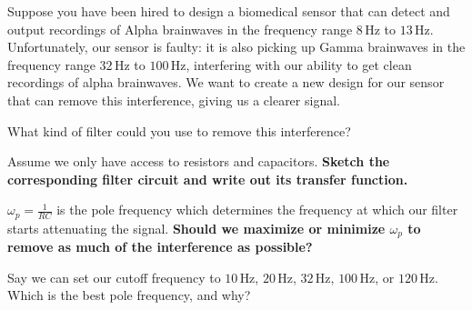 
Suppose you have been hired to design a biomedical sensor that can detect and output recordings of Alpha brainwaves in the frequency range $8 \, \text{Hz}$ to $13 \, \text{Hz}$. 
Unfortunately, our sensor is faulty: it is also picking up Gamma brainwaves in the frequency range $32 \, \text{Hz}$ to $100 \, \text{Hz}$, interfering with our ability to get clean recordings of alpha brainwaves. 
We want to create a new design for our sensor that can remove this interference, giving us a clearer signal.

\begin{enumerate}

	\qitem What kind of filter could you use to remove this interference? 
    
	
	\qitem Assume we only have access to resistors and capacitors. \textbf{Sketch the corresponding filter circuit and write out its transfer function.} 


	\qitem $\omega_p = \frac{1}{RC}$ is the pole frequency which determines the frequency at which our filter starts attenuating the signal. \textbf{Should we maximize or minimize $\omega_p$ to remove as much of the interference as possible?}


	\qitem Say we can set our cutoff frequency to $10 \, \text{Hz}$, $20 \, \text{Hz}$, $32 \, \text{Hz}$, $100 \, \text{Hz}$, or $120 \, \text{Hz}$. Which is the best pole frequency, and why?



\end{enumerate}
